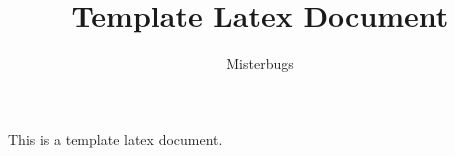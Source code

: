 



\title{Template Latex Document}
\author{Misterbugs}


	
	\maketitle
	
	This is a template latex document.
	
